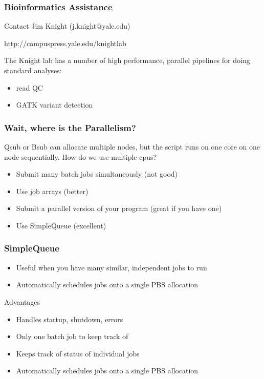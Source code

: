\documentclass[10pt]{beamer}
\begin{document}
\begin{frame}[fragile]
\frametitle{Bioinformatics Assistance}

Contact Jim Knight (j.knight@yale.edu)

http://campuspress.yale.edu/knightlab

The Knight lab has a number of high performance, parallel pipelines for
doing standard analyses:

\begin{itemize}
\item read QC
\item GATK variant detection
\end{itemize}
\end{frame}


\begin{frame}[fragile]
\frametitle{Wait, where is the Parallelism?}

Qsub or Bsub can allocate multiple nodes, but the script runs on one core on one node sequentially.  How do we use multiple cpus?

\begin{itemize}
\item Submit many batch jobs simultaneously (not good)
\item Use job arrays (better)
\item Submit a parallel version of your program (great if you have one)
\item Use SimpleQueue (excellent)
\end{itemize}

\end{frame}

\begin{frame}[fragile]
\frametitle{SimpleQueue}

\begin{itemize}
\item Useful when you have many similar, independent jobs to run
\item Automatically schedules jobs onto a single PBS allocation
\end{itemize}

Advantages

\begin{itemize}
\item Handles startup, shutdown, errors
\item Only one batch job to keep track of
\item Keeps track of status of individual jobs
\item Automatically schedules jobs onto a single PBS allocation
\end{itemize}

\end{frame}
\end{document}

